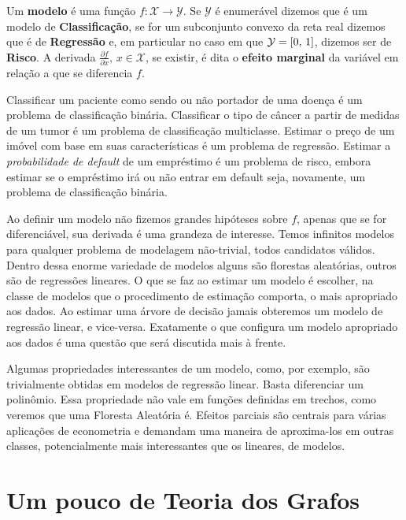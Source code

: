 \begin{defi}[Modelos]
Um \textbf{modelo} é uma função $f: \mathcal{X} \to \mathcal{Y}$. Se $\mathcal{Y}$ é enumerável dizemos que é um modelo de \textbf{Classificação}, se for um subconjunto convexo da reta real dizemos que é de \textbf{Regressão} e, em particular no caso em que $\mathcal{Y} = [0, \,1]$, dizemos ser de \textbf{Risco}. A derivada $\frac{\partial f}{\partial x}, \, x \in \mathcal{X}$, se existir, é dita o \textbf{efeito marginal} da variável em relação a que se diferencia $f$.
\end{defi} 

Classificar um paciente como sendo ou não portador de uma doença é  um problema de classificação binária. Classificar o tipo de câncer a partir de medidas de um tumor é um problema de classificação multiclasse. Estimar o preço de um imóvel com base em suas características é um problema de regressão. Estimar a \textit{probabilidade de default}  de um empréstimo é um problema de risco, embora estimar se o empréstimo irá ou não entrar em default seja, novamente, um problema de classificação binária. 

Ao definir um modelo não fizemos grandes hipóteses sobre $f$, apenas que se for diferenciável, sua derivada é uma grandeza de interesse. Temos infinitos modelos para qualquer problema de modelagem não-trivial, todos candidatos válidos. Dentro dessa enorme variedade de modelos alguns são florestas aleatórias, outros são de regressões lineares. O que se faz ao estimar um modelo é escolher, na classe de modelos que o procedimento de estimação comporta, o mais apropriado aos dados. Ao estimar uma árvore de decisão jamais obteremos um modelo de regressão linear, e vice-versa. Exatamente o que configura um modelo apropriado aos dados é uma questão que será discutida mais à frente.

Algumas propriedades interessantes de um modelo, como, por exemplo, são trivialmente obtidas em modelos de regressão linear. Basta diferenciar um polinômio. Essa propriedade não vale em funções definidas em trechos, como veremos que uma Floresta Aleatória é. Efeitos parciais são centrais para várias aplicações de econometria e demandam uma maneira de aproxima-los em outras classes, potencialmente mais interessantes que os lineares, de modelos. 

\section{Um pouco de Teoria dos Grafos}

